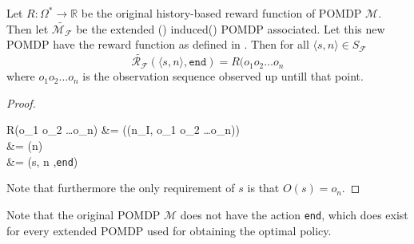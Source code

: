 \begin{lemma}
Let $R:\Omega^*\to\mathbb{R}$ be the original history-based reward function of POMDP $\mathcal{M}$. Then let $\widetilde{\mathcal{M}_\mathcal{F}}$ be the extended () induced() POMDP associated. Let this new POMDP have the reward function as defined in . Then for all $\langle s,n\rangle \in S_\mathcal{F}$ 
\[ \widetilde{\mathcal{R}_\mathcal{F}}(\langle s,n\rangle,\texttt{end}) = R(o_1 o_2 \dots o_n \]
where $o_1 o_2 \dots o_n$ is the observation sequence observed up untill that point.
\begin{proof}
	\begin{flalign*}
	R(o_1 o_2 \dots o_n) &= \sigma(\delta*(n_I, o_1 o_2 \dots o_n))  \hfill {} \\
	&= \sigma(n) \\
	&= (\langle s, n \rangle,\texttt{end}) \hfill {}
	\end{flalign*}
Note that furthermore the only requirement of $s$ is that $O(s) = o_n$.
\end{proof}
\end{lemma}

Note that the original POMDP $\mathcal{M}$ does not have the action \texttt{end}, which does exist for every extended POMDP used for obtaining the optimal policy. 